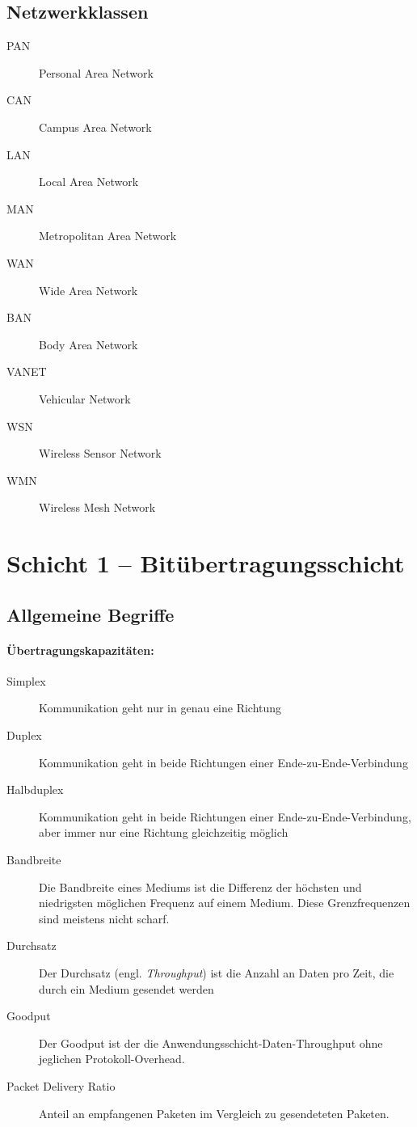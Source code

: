 \documentclass[a4paper,10pt]{scrartcl}
\begin{document}
\subsection{Netzwerkklassen}
\begin{description}
\item[PAN]   Personal Area Network
\item[CAN]   Campus Area Network
\item[LAN]   Local Area Network
\item[MAN]   Metropolitan Area Network
\item[WAN]   Wide Area Network \\
\hrulefill
\item[BAN]   Body Area Network
\item[VANET] Vehicular Network
\item[WSN]   Wireless Sensor Network
\item[WMN]   Wireless Mesh Network
\end{description}

\section{Schicht 1 -- Bitübertragungsschicht}
\subsection{Allgemeine Begriffe}
\paragraph{Übertragungskapazitäten:}
\begin{description}
\item[Simplex] Kommunikation geht nur in genau eine Richtung
\item[Duplex] Kommunikation geht in beide Richtungen einer Ende-zu-Ende-Verbindung
\item[Halbduplex] Kommunikation geht in beide Richtungen einer Ende-zu-Ende-Verbindung, aber immer nur eine Richtung gleichzeitig möglich
\end{description}

\begin{description}
\item[Bandbreite] Die Bandbreite eines Mediums ist die Differenz der höchsten und niedrigsten möglichen Frequenz auf einem Medium. Diese Grenzfrequenzen sind meistens nicht scharf.
\item[Durchsatz] Der Durchsatz (engl. \emph{Throughput}) ist die Anzahl an Daten pro Zeit, die durch ein Medium gesendet werden
\item[Goodput] Der Goodput ist der die Anwendungsschicht-Daten-Throughput ohne jeglichen Protokoll-Overhead.
\item[Packet Delivery Ratio] Anteil an empfangenen Paketen im Vergleich zu gesendeteten Paketen.
\end{description}
\end{document}
